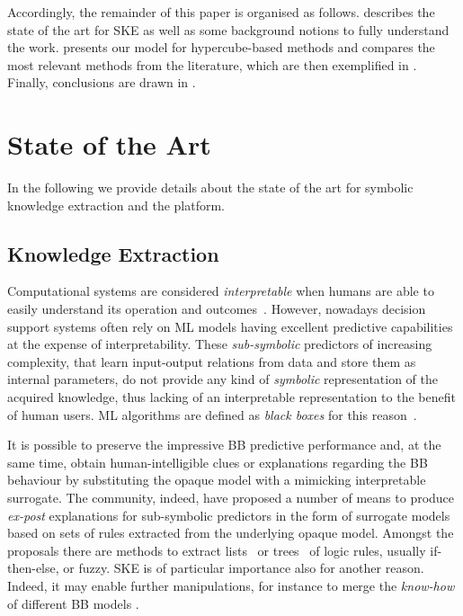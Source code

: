 \documentclass[
]{ceurart}
\begin{document}
Accordingly, the remainder of this paper is organised as follows.
%
 describes the state of the art for SKE as well as some background notions to fully understand the work.
%
 presents our model for hypercube-based methods and compares the most relevant methods from the literature, which are then exemplified in .
%
Finally, conclusions are drawn in .

\section{State of the Art}\label{sec:state}

In the following we provide details about the state of the art for symbolic knowledge extraction and the \psyke{} platform.

\subsection{Knowledge Extraction}\label{ssec:extraction}

Computational systems are considered \emph{interpretable} when humans are able to easily understand its operation and outcomes~\cite{agentbasedxai-aamas2020}.
%
However, nowadays decision support systems often rely on ML models having excellent predictive capabilities at the expense of interpretability.
%
These \emph{sub-symbolic} predictors of increasing complexity, that learn input-output relations from data and store them as internal parameters, do not provide any kind of \emph{symbolic} representation of the acquired knowledge, thus lacking of an interpretable representation to the benefit of human users.
%
ML algorithms are defined as \emph{black boxes} for this reason~\cite{Lipton2018}.

It is possible to preserve the impressive BB predictive performance and, at the same time, obtain human-intelligible clues or explanations regarding the BB behaviour by substituting the opaque model with a mimicking interpretable surrogate.
%
The \xai{} community, indeed, have proposed a number of means to produce \emph{ex-post} explanations for sub-symbolic predictors in the form of surrogate models based on sets of rules extracted from the underlying opaque model.
%
Amongst the proposals there are methods to extract lists~\cite{craven1994using,huysmans2006iter,gridex-extraamas2021} or trees~\cite{craven1996extracting,breiman1984classification} of logic rules, usually if-then-else, \mofn{} or fuzzy.
%
SKE is of particular importance also for another reason.
%
Indeed, it may enable further manipulations, for instance to merge the \emph{know-how} of different BB models \cite{xmas-aiiot2019}.
\end{document}
